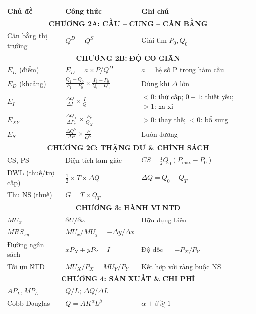 \documentclass[a4paper,11pt]{article}
\begin{document}
\begin{center}
\renewcommand{\arraystretch}{1.6}
\begin{tabular}{|p{4cm}|p{5.5cm}|p{5.5cm}|}
\hline
\textbf{Chủ đề} & \textbf{Công thức} & \textbf{Ghi chú}\\
\hline
\multicolumn{3}{|c|}{\textbf{CHƯƠNG 2A: CẦU -- CUNG -- CÂN BẰNG}}\\
\hline
Cân bằng thị trường & $Q^D = Q^S$ & Giải tìm $P_0, Q_0$\\
\hline
\multicolumn{3}{|c|}{\textbf{CHƯƠNG 2B: ĐỘ CO GIÃN}}\\
\hline
$E_D$ (điểm) & $E_D = a \times P/Q^D$ & $a$ = hệ số P trong hàm cầu\\
\hline
$E_D$ (khoảng) & $\frac{Q_1 - Q_0}{P_1 - P_0} \times \frac{P_1 + P_0}{Q_1 + Q_0}$ & Dùng khi $\Delta$ lớn\\
\hline
$E_I$ & $\frac{\Delta Q}{\Delta I} \times \frac{I}{Q}$ & $<0$: thứ cấp; $0\!-\!1$: thiết yếu; $>1$: xa xỉ\\
\hline
$E_{XY}$ & $\frac{\Delta Q_X}{\Delta P_Y} \times \frac{P_Y}{Q_X}$ & $>0$: thay thế; $<0$: bổ sung\\
\hline
$E_S$ & $\frac{\Delta Q^S}{\Delta P} \times \frac{P}{Q^S}$ & Luôn dương\\
\hline
\multicolumn{3}{|c|}{\textbf{CHƯƠNG 2C: THẶNG DƯ \& CHÍNH SÁCH}}\\
\hline
CS, PS & Diện tích tam giác & $CS = \frac{1}{2} Q_0 (P_{\max} - P_0)$\\
\hline
DWL (thuế/trợ cấp) & $\frac{1}{2} \times T \times \Delta Q$ & $\Delta Q = Q_0 - Q_T$\\
\hline
Thu NS (thuế) & $G = T \times Q_T$ & \\
\hline
\multicolumn{3}{|c|}{\textbf{CHƯƠNG 3: HÀNH VI NTD}}\\
\hline
$MU_x$ & $\partial U / \partial x$ & Hữu dụng biên\\
\hline
$MRS_{xy}$ & $MU_x / MU_y = -\Delta y / \Delta x$ & \\
\hline
Đường ngân sách & $xP_X + yP_Y = I$ & Độ dốc $= -P_X/P_Y$\\
\hline
Tối ưu NTD & $MU_X/P_X = MU_Y/P_Y$ & Kết hợp với ràng buộc NS\\
\hline
\multicolumn{3}{|c|}{\textbf{CHƯƠNG 4: SẢN XUẤT \& CHI PHÍ}}\\
\hline
$AP_L, MP_L$ & $Q/L$; \quad $\Delta Q / \Delta L$ & \\
\hline
Cobb-Douglas & $Q = AK^\alpha L^\beta$ & $\alpha+\beta \gtrless 1$\\
\hline

\end{tabular}
\end{center}
\end{document}
